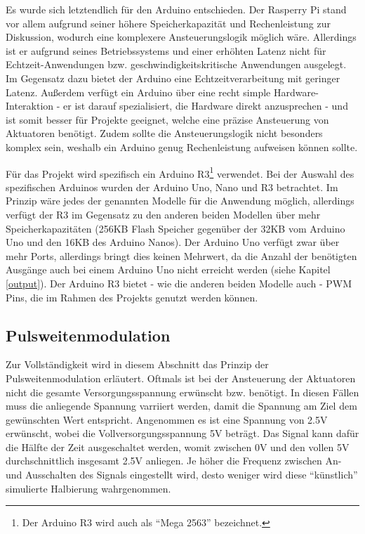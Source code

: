Es wurde sich letztendlich für den Arduino entschieden.
Der Rasperry Pi stand vor allem aufgrund seiner höhere Speicherkapazität und Rechenleistung zur Diskussion, wodurch eine komplexere Ansteuerungslogik möglich wäre.
Allerdings ist er aufgrund seines Betriebssystems und einer erhöhten Latenz nicht für Echtzeit-Anwendungen bzw. geschwindigkeitskritische Anwendungen ausgelegt. %
Im Gegensatz dazu bietet der Arduino eine Echtzeitverarbeitung mit geringer Latenz.
Außerdem verfügt ein Arduino über eine recht simple Hardware-Interaktion - er ist darauf spezialisiert, die Hardware direkt anzusprechen - und ist somit besser für Projekte geeignet, welche eine präzise Ansteuerung von Aktuatoren benötigt. %
Zudem sollte die Ansteuerungslogik nicht besonders komplex sein, weshalb ein Arduino genug Rechenleistung aufweisen können sollte.

Für das Projekt wird spezifisch ein Arduino R3\footnote{Der Arduino R3 wird auch als \enquote{Mega 2563} bezeichnet.} verwendet.
Bei der Auswahl des spezifischen Arduinos wurden der Arduino Uno, Nano und R3 betrachtet.
Im Prinzip wäre jedes der genannten Modelle für die Anwendung möglich, allerdings verfügt der R3 im Gegensatz zu den anderen beiden Modellen über mehr Speicherkapazitäten (256KB Flash Speicher
gegenüber der 32KB vom Arduino Uno und den 16KB des Arduino Nanos).
Der Arduino Uno verfügt zwar über mehr Ports, allerdings bringt dies keinen Mehrwert, da die Anzahl der benötigten Ausgänge auch bei einem Arduino Uno nicht erreicht werden
(siehe Kapitel \ref{output}).
Der Arduino R3 bietet - wie die anderen beiden Modelle auch - \ac{PWM} Pins, die im Rahmen des Projekts genutzt werden können.

\subsection{Pulsweitenmodulation}\label{PWM}
Zur Vollständigkeit wird in diesem Abschnitt das Prinzip der Pulsweitenmodulation erläutert.
Oftmals ist bei der Ansteuerung der Aktuatoren nicht die gesamte Versorgungsspannung erwünscht bzw. benötigt.
In diesen Fällen muss die anliegende Spannung varriiert werden, damit die Spannung am Ziel dem gewünschten Wert entspricht.
Angenommen es ist eine Spannung von 2.5V erwünscht, wobei die Vollversorgungsspannung 5V beträgt.
Das Signal kann dafür die Hälfte der Zeit ausgeschaltet werden, womit zwischen 0V und den vollen 5V durchschnittlich insgesamt 2.5V anliegen.
Je höher die Frequenz zwischen An- und Ausschalten des Signals eingestellt wird, desto weniger wird diese \enquote{künstlich} simulierte Halbierung wahrgenommen.

